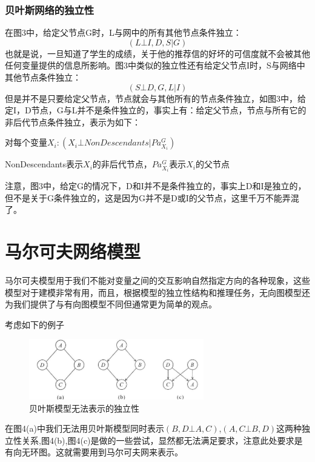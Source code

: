 \documentclass{article} %
\begin{document}
\begin{CJK*}{UTF8}{gkai}
\subsubsection{贝叶斯网络的独立性}
在图3中，给定父节点G时，L与网中的所有其他节点条件独立：
\begin{equation}
\left( L \bot I,D,S \vert G \right)
\end{equation}
也就是说，一旦知道了学生的成绩，关于他的推荐信的好坏的可信度就不会被其他任何变量提供的信息所影响。图3中类似的独立性还有给定父节点I时，S与网络中其他节点条件独立：
\begin{equation}
\left( S \bot D,G,L \vert I \right)
\end{equation}
但是并不是只要给定父节点，节点就会与其他所有的节点条件独立，如图3中，给定I，D节点，G与L并不是条件独立的，事实上有：给定父节点，节点与所有它的非后代节点条件独立，表示为如下：

对每个变量$X _{i}:\left( X _{i} \bot NonDescendants \vert Pa ^{G} _{X _{i}} \right)$

NonDescendants表示$X _{i}$的非后代节点，$Pa ^{G} _{X _{i}}$表示$X _{i}$的父节点

注意，图3中，给定G的情况下，D和I并不是条件独立的，事实上D和I是独立的，但不是关于G条件独立的，这是因为G并不是D或I的父节点，这里千万不能弄混了。

\section{马尔可夫网络模型}
马尔可夫模型用于我们不能对变量之间的交互影响自然指定方向的各种现象，这些模型对于建模非常有用，而且，根据模型的独立性结构和推理任务，无向图模型还为我们提供了与有向图模型不同但通常更为简单的观点。

考虑如下的例子
\begin{figure}[h]
\begin{center}

\includegraphics[width=3in]{4.png}

\end{center}
\caption{贝叶斯模型无法表示的独立性}
\end{figure}

在图4(a)中我们无法用贝叶斯模型同时表示$\left( B,D \bot A,C \right)$,$\left( A,C \bot B,D \right)$这两种独立性关系,图4(b),图4(c)是做的一些尝试，显然都无法满足要求，注意此处要求是有向无环图。这就需要用到马尔可夫网来表示。

\end{CJK*}
\end{document}

